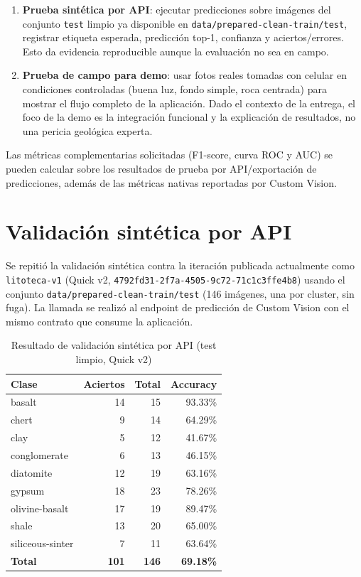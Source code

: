 \begin{enumerate}
  \item \textbf{Prueba sintética por API}: ejecutar predicciones sobre imágenes del
        conjunto \texttt{test} limpio ya disponible en \texttt{data/prepared-clean-train/test},
        registrar etiqueta esperada, predicción top-1, confianza y aciertos/errores.
        Esto da evidencia reproducible aunque la evaluación no sea en campo.
  \item \textbf{Prueba de campo para demo}: usar fotos reales tomadas con celular en
        condiciones controladas (buena luz, fondo simple, roca centrada) para mostrar
        el flujo completo de la aplicación. Dado el contexto de la entrega, el foco
        de la demo es la integración funcional y la explicación de resultados, no una
        pericia geológica experta.
\end{enumerate}

Las métricas complementarias solicitadas (F1-score, curva ROC y AUC) se pueden
calcular sobre los resultados de prueba por API/exportación de predicciones, además
de las métricas nativas reportadas por Custom Vision.

\section{Validación sintética por API}

Se repitió la validación sintética contra la iteración publicada actualmente como
\texttt{litoteca-v1} (Quick v2, \texttt{4792fd31-2f7a-4505-9c72-71c1c3ffe4b8}) usando
el conjunto \texttt{data/prepared-clean-train/test} (146 imágenes, una por cluster,
sin fuga). La llamada se realizó al endpoint de predicción de Custom Vision con el
mismo contrato que consume la aplicación.

\begin{table}[H]
  \centering
  \caption{Resultado de validación sintética por API (test limpio, Quick v2)}
  \label{tab:api-test}
  \begin{tabular}{@{}lrrr@{}}
    \toprule
    Clase & Aciertos & Total & Accuracy \\
    \midrule
    basalt & 14 & 15 & 93.33\% \\
    chert & 9 & 14 & 64.29\% \\
    clay & 5 & 12 & 41.67\% \\
    conglomerate & 6 & 13 & 46.15\% \\
    diatomite & 12 & 19 & 63.16\% \\
    gypsum & 18 & 23 & 78.26\% \\
    olivine-basalt & 17 & 19 & 89.47\% \\
    shale & 13 & 20 & 65.00\% \\
    siliceous-sinter & 7 & 11 & 63.64\% \\
    \midrule
    \textbf{Total} & \textbf{101} & \textbf{146} & \textbf{69.18\%} \\
    \bottomrule
  \end{tabular}
\end{table}

